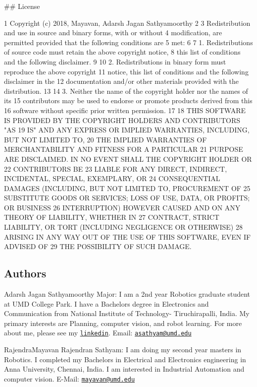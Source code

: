 \#\# License 
\begin{DoxyCode}
1 Copyright (c) 2018, Mayavan,  Adarsh Jagan Sathyamoorthy 
2 
3 Redistribution and use in source and binary forms, with or without  
4 modification, are permitted provided that the following conditions are 
5 met:
6 
7 1. Redistributions of source code must retain the above copyright notice, 
8 this list of conditions and the following disclaimer.
9 
10 2. Redistributions in binary form must reproduce the above copyright 
11 notice, this list of conditions and the following disclaimer in the   
12 documentation and/or other materials provided with the distribution.
13 
14 3. Neither the name of the copyright holder nor the names of its 
15 contributors may be used to endorse or promote products derived from this 
16 software without specific prior written permission.
17 
18 THIS SOFTWARE IS PROVIDED BY THE COPYRIGHT HOLDERS AND CONTRIBUTORS "AS 
19 IS" AND ANY EXPRESS OR IMPLIED WARRANTIES, INCLUDING, BUT NOT LIMITED TO, 
20 THE IMPLIED WARRANTIES OF MERCHANTABILITY AND FITNESS FOR A PARTICULAR 
21 PURPOSE ARE DISCLAIMED. IN NO EVENT SHALL THE COPYRIGHT HOLDER OR 
22 CONTRIBUTORS BE 
23 LIABLE FOR ANY DIRECT, INDIRECT, INCIDENTAL, SPECIAL, EXEMPLARY, OR 
24 CONSEQUENTIAL DAMAGES (INCLUDING, BUT NOT LIMITED TO, PROCUREMENT OF 
25 SUBSTITUTE GOODS OR SERVICES; LOSS OF USE, DATA, OR PROFITS; OR BUSINESS 
26 INTERRUPTION) HOWEVER CAUSED AND ON ANY THEORY OF LIABILITY, WHETHER IN 
27 CONTRACT, STRICT LIABILITY, OR TORT (INCLUDING NEGLIGENCE OR OTHERWISE) 
28 ARISING IN ANY WAY OUT OF THE USE OF THIS SOFTWARE, EVEN IF ADVISED OF 
29 THE POSSIBILITY OF SUCH DAMAGE.
\end{DoxyCode}


\subsection*{Authors}


\begin{DoxyItemize}
\item Adarsh Jagan Sathyamoorthy Major\+: I am a 2nd year Robotics graduate student at U\+MD College Park. I have a Bachelors degree in Electronics and Communication from National Institute of Technology-\/ Tiruchirapalli, India. My primary interests are Planning, computer vision, and robot learning. For more about me, please see my \href{https://www.linkedin.com/in/adarsh-jagan-sathyamoorthy-6b6726b3/}{\tt linkedin}. Email\+: \href{mailto:asathyam@umd.edu}{\tt asathyam@umd.\+edu}
\item Rajendra\+Mayavan Rajendran Sathyam\+: I am doing my second year master\textquotesingle{}s in Robotics. I completed my Bachelors in Electrical and Electronics engineering in Anna University, Chennai, India. I am interested in Industrial Automation and computer vision. E-\/\+Mail\+: \href{mailto:mayavan@umd.edu}{\tt mayavan@umd.\+edu} 
\end{DoxyItemize}